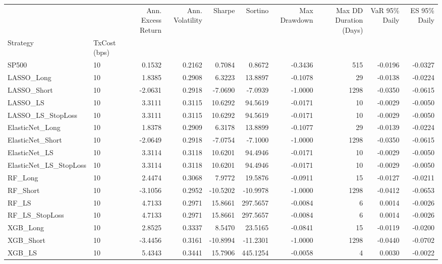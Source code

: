 \begin{tabular}{llrrrrrrrr}
\toprule
 &  & Ann. Excess Return & Ann. Volatility & Sharpe & Sortino & Max Drawdown & Max DD Duration (Days) & VaR 95\% Daily & ES 95\% Daily \\
Strategy & TxCost (bps) &  &  &  &  &  &  &  &  \\
\midrule
SP500 & 10 & 0.1532 & 0.2162 & 0.7084 & 0.8672 & -0.3436 & 515 & -0.0196 & -0.0327 \\
\cline{1-10}
LASSO\_Long & 10 & 1.8385 & 0.2908 & 6.3223 & 13.8897 & -0.1078 & 29 & -0.0138 & -0.0224 \\
\cline{1-10}
LASSO\_Short & 10 & -2.0631 & 0.2918 & -7.0690 & -7.0939 & -1.0000 & 1298 & -0.0350 & -0.0615 \\
\cline{1-10}
LASSO\_LS & 10 & 3.3111 & 0.3115 & 10.6292 & 94.5619 & -0.0171 & 10 & -0.0029 & -0.0050 \\
\cline{1-10}
LASSO\_LS\_StopLoss & 10 & 3.3111 & 0.3115 & 10.6292 & 94.5619 & -0.0171 & 10 & -0.0029 & -0.0050 \\
\cline{1-10}
ElasticNet\_Long & 10 & 1.8378 & 0.2909 & 6.3178 & 13.8899 & -0.1077 & 29 & -0.0139 & -0.0224 \\
\cline{1-10}
ElasticNet\_Short & 10 & -2.0649 & 0.2918 & -7.0754 & -7.1000 & -1.0000 & 1298 & -0.0350 & -0.0615 \\
\cline{1-10}
ElasticNet\_LS & 10 & 3.3114 & 0.3118 & 10.6201 & 94.4946 & -0.0171 & 10 & -0.0029 & -0.0050 \\
\cline{1-10}
ElasticNet\_LS\_StopLoss & 10 & 3.3114 & 0.3118 & 10.6201 & 94.4946 & -0.0171 & 10 & -0.0029 & -0.0050 \\
\cline{1-10}
RF\_Long & 10 & 2.4474 & 0.3068 & 7.9772 & 19.5876 & -0.0911 & 15 & -0.0127 & -0.0211 \\
\cline{1-10}
RF\_Short & 10 & -3.1056 & 0.2952 & -10.5202 & -10.9978 & -1.0000 & 1298 & -0.0412 & -0.0653 \\
\cline{1-10}
RF\_LS & 10 & 4.7133 & 0.2971 & 15.8661 & 297.5657 & -0.0084 & 6 & 0.0014 & -0.0026 \\
\cline{1-10}
RF\_LS\_StopLoss & 10 & 4.7133 & 0.2971 & 15.8661 & 297.5657 & -0.0084 & 6 & 0.0014 & -0.0026 \\
\cline{1-10}
XGB\_Long & 10 & 2.8525 & 0.3337 & 8.5470 & 23.5165 & -0.0841 & 15 & -0.0119 & -0.0200 \\
\cline{1-10}
XGB\_Short & 10 & -3.4456 & 0.3161 & -10.8994 & -11.2301 & -1.0000 & 1298 & -0.0440 & -0.0702 \\
\cline{1-10}
XGB\_LS & 10 & 5.4343 & 0.3441 & 15.7906 & 445.1254 & -0.0058 & 4 & 0.0030 & -0.0022 \\

\end{tabular}
